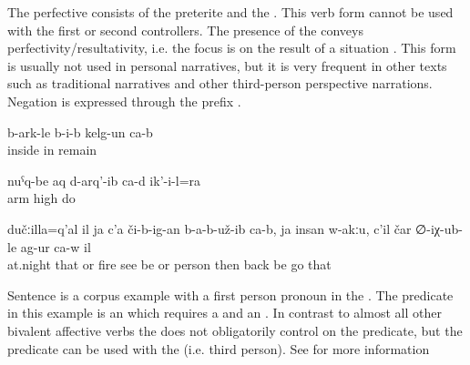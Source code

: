 The perfective  consists of the preterite and the . This verb form cannot be used with the first or second  controllers. The presence of the  conveys perfectivity/resultativity, i.e. the focus is on the result of a situation . This form is usually not used in personal narratives, but it is very frequent in other texts such as traditional narratives and other third-person perspective narrations. Negation is expressed through the prefix  .

\begin{exe}
	\ex	\label{ex:(The color) has remained inside}
	\gll	b-ark-le	b-i-b	kelg-un	ca-b\\
		inside	in	remain	\\
	\glt	{}

	\ex	\label{ex:He has also taken up his hands}
	\gll	nuˁq-be	aq	d-arq'-ib	ca-d	ik'-i-l=ra\\
		arm	high	do		\\
	\glt	{}
	
	\ex	\label{ex:‎‎‎It was at night, there was no fire visible, nobody is there, then he turned and came back}
	\gll	dučːilla=q'al	il	ja	c'a	či-b-ig-an	b-a-b-už-ib	ca-b,		ja	insan	w-akːu,		c'il	čar	∅-iχ-ub-le	ag-ur	ca-w	il\\
		at.night	that	or	fire	see	be			or	person	\tsc{m-}	then	back	be	go		that\\
	\glt	{}
\end{exe}

Sentence  is a corpus example with a first person pronoun in the . The predicate in this example is an  which requires a   and an  . In contrast to almost all other bivalent affective verbs the  does not obligatorily control  on the predicate, but the predicate can be used with the  (i.e. third person). See  for more information

